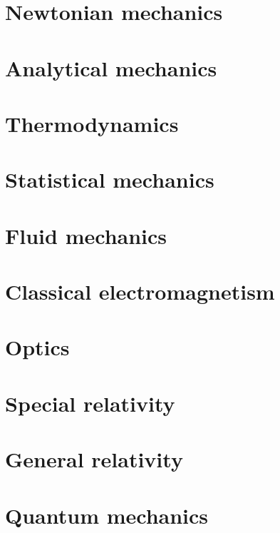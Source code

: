 \documentclass{report}
\begin{document}
\part{Newtonian mechanics}
\setcounter{chapter}{0} %


\part{Analytical mechanics}
\setcounter{chapter}{0} %


\part{Thermodynamics}
\setcounter{chapter}{0} %

\part{Statistical mechanics}
\setcounter{chapter}{0} %


\part{Fluid mechanics}
\setcounter{chapter}{0} %


\part{Classical electromagnetism}
\setcounter{chapter}{0} %


\part{Optics}
\setcounter{chapter}{0} %



\part{Special relativity}
\setcounter{chapter}{0} %


\part{General relativity}
\setcounter{chapter}{0} %


\part{Quantum mechanics}
\setcounter{chapter}{0} %



\end{document}
